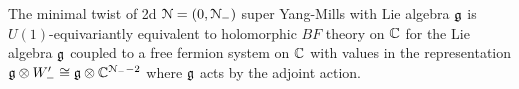 \documentclass[10pt, oneside]{article}
\begin{document}


\begin{theorem} \label{4d_2_minimal_twist_thm}
The minimal twist of 2d $\mathcal N=(0,\mathcal N_-)$ super Yang-Mills with Lie algebra $\mathfrak g$ is $U(1)$-equivariantly equivalent to holomorphic $BF$ theory on $\mathbb C$ for the Lie algebra $\mathfrak g$ coupled to a free fermion system on $\mathbb C$ with values in the representation $\mathfrak g \otimes W_-' \cong \mathfrak g \otimes \mathbb C^{\mathcal N_- - 2}$ where $\mathfrak g$ acts by the adjoint action. 
\end{theorem}
\end{document}
